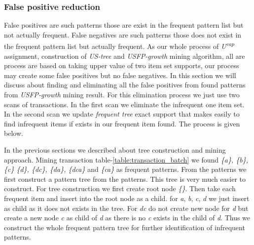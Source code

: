 \documentclass[conference]{IEEEtran}
\begin{document}
\subsubsection{False positive reduction}
    False positives are such patterns those are exist in the frequent pattern list but not actually frequent. False negatives are such patterns those does not exist in the frequent pattern list but actually frequent. As our whole process of \emph{U\textsuperscript{cap}} assignment, construction of \emph{US-tree} and \emph{USFP-growth} mining algorithm, all are process are based on taking upper value of two item set supports, our process may create some false positives but no false negatives. In this section we will discuss about finding and eliminating all the false positives from found patterns from \emph{USFP-growth} mining result. For this elimination process we just use two scans of transactions. In the first scan we eliminate the infrequent one item set. In the second scan we update \emph{frequent tree} exact support that makes easily to find infrequent items if exists in our frequent item found. The process is given below.

In the previous sections we described about tree construction and mining approach. Mining transaction table-\ref{table:transaction_batch} we found \emph{\{a\}, \{b\}, \{c\} \{d\}, \{dc\}, \{da\}, \{dca\}} and \emph{\{ca\}} as frequent patterns. From the patterns we first construct a pattern tree from the patterns. This tree is very much easier to construct. For tree construction we first create root node \emph{\{\}}. Then take each frequent item and insert into the root node as a child. for \emph{a}, \emph{b}, \emph{c}, \emph{d} we just insert as child as it does not exists in the tree. For \emph{dc} do not create new node for \emph{d} but create a new node \emph{c} as child of \emph{d} as there is no \emph{c} exists in the child of \emph{d}. Thus we construct the whole frequent pattern tree for further identification of infrequent patterns.
\end{document}
